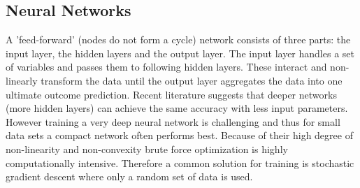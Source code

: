 \subsection{Neural Networks}
	A 'feed-forward' (nodes do not form a cycle) network consists of three parts: the input layer, the hidden layers and the output layer.
	The input layer handles a set of variables and passes them to following hidden layers.
	These interact and non-linearly transform the data until the output layer aggregates the data
	into one ultimate outcome prediction.
	Recent literature suggests that deeper networks (more hidden layers) can achieve the same
	accuracy with less input parameters.
	However training a very deep neural network is challenging and thus for small data sets
	a compact network often performs best.
	Because of their high degree of non-linearity and non-convexity brute force optimization is
	highly computationally intensive. Therefore a common solution for training is stochastic
	gradient descent where only a random set of data is used.
